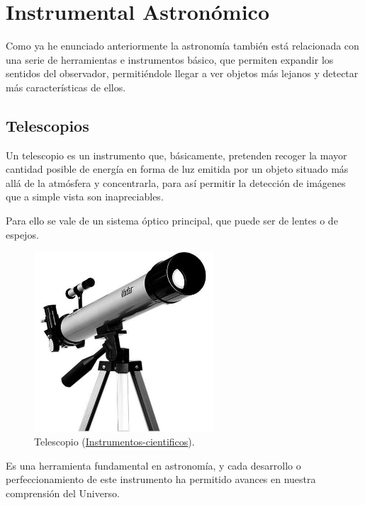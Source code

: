 \newpage

\newpage
\section{Instrumental Astronómico}

Como ya he enunciado anteriormente la astronomía también está relacionada  con una serie de herramientas e instrumentos básico, que permiten expandir los sentidos del observador,
permitiéndole llegar a ver objetos más lejanos y detectar más características de ellos.  

\subsection{Telescopios}

Un telescopio es un instrumento que, básicamente, pretenden recoger la mayor cantidad posible de energía en forma de luz emitida por un objeto situado más allá de la atmósfera y concentrarla, para así permitir la detección de imágenes que a simple vista son inapreciables. \cite{Telescopio}

\bigskip
Para ello se vale de un sistema óptico principal, que puede ser de lentes o de espejos.


\begin{figure}[!ht]
	\begin{center}
		\includegraphics[width=0.6\textwidth]{../images/telescopio2.jpg}
			\caption[Telescopio]{Telescopio (\href{http://cienciaaaoa.blogspot.com.es/2014/11/instrumentos-cientificos_20.html}{Instrumentos-cientificos}).}
		\label{fig:telescop}
	\end{center}
\end{figure}

\bigskip
 Es una herramienta fundamental en astronomía, y cada desarrollo o perfeccionamiento de este instrumento ha permitido avances en nuestra comprensión del Universo.



